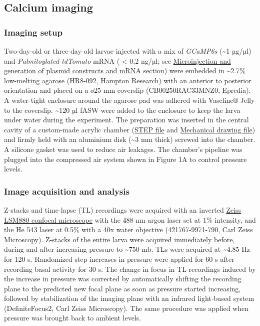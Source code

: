 \documentclass[
]{article}
\begin{document}
\hypertarget{calcium-imaging}{%
\subsection{Calcium imaging}\label{calcium-imaging}}

\hypertarget{imaging-setup}{%
\subsubsection{Imaging setup}\label{imaging-setup}}

Two-day-old or three-day-old larvae injected with a mix of
\emph{GCaMP6s} (\textasciitilde1 µg/µl) and
\emph{Palmitoylated-tdTomato} mRNA ( \textless{} 0.2 ng/µl; see
\protect\hyperlink{microinjection-and-generation-of-plasmid-constructs-and-mrna}{Microinjection
and generation of plasmid constructs and mRNA} section) were embedded in
\textasciitilde2.7\% low-melting agarose (HR8-092, Hampton Research)
with an anterior to posterior orientation and placed on a ø25 mm
coverslip (CB00250RAC33MNZ0, Epredia). A water-tight enclosure around
the agarose pad was adhered with Vaseline® Jelly to the coverslip.
\textasciitilde120 µl fASW were added to the enclosure to keep the larva
under water during the experiment. The preparation was inserted in the
central cavity of a custom-made acrylic chamber
(\href{https://github.com/JekelyLab/Bezares_et_al_2023_Pressure/blob/main/Data/Mechanical_drawings/Microscopy_pressure_chamber.step}{STEP
file} and
\href{https://github.com/JekelyLab/Bezares_et_al_2023_Pressure/blob/main/Data/Mechanical_drawings/Microscopy_pressure_chamber.pdf}{Mechanical
drawing file}) and firmly held with an aluminium disk (\textasciitilde3
mm thick) screwed into the chamber. A silicone gasket was used to reduce
air leakages. The chamber's pipeline was plugged into the compressed air
system shown in Figure 1A to control pressure levels.

\hypertarget{image-acquisition-and-analysis}{%
\subsubsection{Image acquisition and
analysis}\label{image-acquisition-and-analysis}}

Z-stacks and time-lapse (TL) recordings were acquired with an inverted
\href{http://biosciences.exeter.ac.uk/bioimaging/equipment/light/zeisslsm880airyscan/}{Zeiss
LSM880 confocal microscope} with the 488 nm argon laser set at 1\%
intensity, and the He 543 laser at 0.5\% with a 40x water objective
(421767-9971-790, Carl Zeiss Microscopy). Z-stacks of the entire larva
were acquired immediately before, during and after increasing pressure
to \textasciitilde750 mb. TLs were acquired at \textasciitilde4.85 Hz
for 120 s. Randomized step increases in pressure were applied for 60 s
after recording basal activity for 30 s. The change in focus in TL
recordings induced by the increase in pressure was corrected by
automatically shifting the recording plane to the predicted new focal
plane as soon as pressure started increasing, followed by stabilization
of the imaging plane with an infrared light-based system
(DefiniteFocus2, Carl Zeiss Microscopy). The same procedure was applied
when pressure was brought back to ambient levels.
\end{document}
